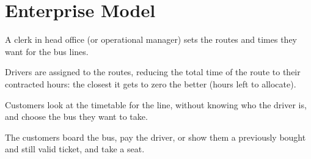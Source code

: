 \section{Enterprise Model}
A clerk in head office (or operational manager) sets the routes and
times they want for the bus lines.

\medskip

Drivers are assigned to the routes, reducing the total time of the
route to their contracted hours: the closest it gets to zero the
better (hours left to allocate).

\medskip

Customers look at the timetable for the line, without knowing who
the driver is, and choose the bus they want to take.

\medskip

The customers board the bus, pay the driver, or show them a
previously bought and still valid ticket, and take a seat.
